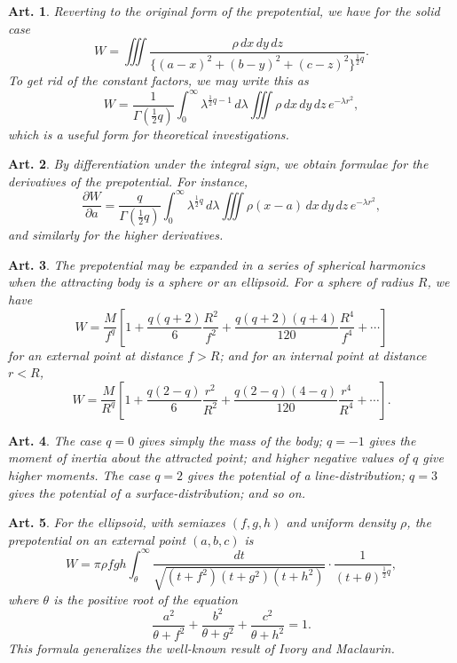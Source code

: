 \documentclass[12pt,a4paper]{article}
\theoremstyle{cayley}
\newtheorem{art}{Art.}[section]
\begin{document}
\begin{art}
Reverting to the original form of the prepotential, we have for the solid case
\[
W = \iiint \frac{\rho\,dx\,dy\,dz}{\{(a-x)^2 + (b-y)^2 + (c-z)^2\}^{\frac{1}{2}q}}.
\]
To get rid of the constant factors, we may write this as
\[
W = \frac{1}{\Gamma(\frac{1}{2}q)} \int_0^{\infty} \lambda^{\frac{1}{2}q-1}\,d\lambda \iiint \rho\,dx\,dy\,dz\,e^{-\lambda r^2},
\]
which is a useful form for theoretical investigations.
\end{art}

\begin{art}
By differentiation under the integral sign, we obtain formulae for the derivatives of the prepotential. For instance,
\[
\frac{\partial W}{\partial a} = \frac{q}{\Gamma(\frac{1}{2}q)} \int_0^{\infty} \lambda^{\frac{1}{2}q}\,d\lambda \iiint \rho(x-a)\,dx\,dy\,dz\,e^{-\lambda r^2},
\]
and similarly for the higher derivatives.
\end{art}

\begin{art}
The prepotential may be expanded in a series of spherical harmonics when the attracting body is a sphere or an ellipsoid. For a sphere of radius $R$, we have
\[
W = \frac{M}{f^q}\left[1 + \frac{q(q+2)}{6}\frac{R^2}{f^2} + \frac{q(q+2)(q+4)}{120}\frac{R^4}{f^4} + \cdots\right]
\]
for an external point at distance $f > R$; and for an internal point at distance $r < R$,
\[
W = \frac{M}{R^q}\left[1 + \frac{q(2-q)}{6}\frac{r^2}{R^2} + \frac{q(2-q)(4-q)}{120}\frac{r^4}{R^4} + \cdots\right].
\]
\end{art}

\begin{art}
The case $q = 0$ gives simply the mass of the body; $q = -1$ gives the moment of inertia about the attracted point; and higher negative values of $q$ give higher moments. The case $q = 2$ gives the potential of a line-distribution; $q = 3$ gives the potential of a surface-distribution; and so on.
\end{art}

\begin{art}
For the ellipsoid, with semiaxes $(f, g, h)$ and uniform density $\rho$, the prepotential on an external point $(a, b, c)$ is
\[
W = \pi\rho fgh \int_{\theta}^{\infty} \frac{dt}{\sqrt{(t+f^2)(t+g^2)(t+h^2)}} \cdot \frac{1}{(t + \theta)^{\frac{1}{2}q}},
\]
where $\theta$ is the positive root of the equation
\[
\frac{a^2}{\theta + f^2} + \frac{b^2}{\theta + g^2} + \frac{c^2}{\theta + h^2} = 1.
\]
This formula generalizes the well-known result of Ivory and Maclaurin.
\end{art}
\end{document}
